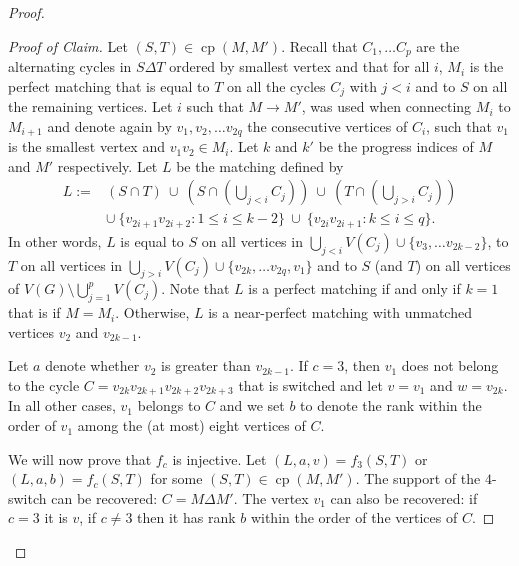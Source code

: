 \documentclass[11pt,a4paper]{article}
\theoremstyle{definition}
\newenvironment{poc}{\begin{proof}[Proof of
    Claim]\renewcommand*{\qedsymbol}{$\blacksquare$}}{\end{proof}}
\DeclareMathOperator{\cp}{cp}
\begin{document}
\begin{proof}
\begin{poc}
    Let $(S, T) \in \cp(M,M')$. Recall that $C_1, \dots C_p$ are the alternating
    cycles in $S \Delta T$ ordered by smallest vertex and that for all $i$,
    $M_i$ is the perfect matching that is equal to $T$ on all the cycles $C_j$
    with $j < i$ and to $S$ on all the remaining vertices. Let $i$ such that
    $M \rightarrow M'$, was used when connecting $M_i$ to $M_{i+1}$ and denote
    again by $v_1, v_2, \dots v_{2q}$ the consecutive vertices of $C_i$, such that
    $v_1$ is the smallest vertex and $v_1v_2 \in M_i$. Let $k$ and $k'$ be the
    progress indices of $M$ and $M'$ respectively. Let $L$ be the matching
    defined by
    \begin{align*}
      L :=& (S \cap T) \ \cup \ \left(S \cap (\bigcup_{j <i} C_j)\right) \ \cup \  \left(T \cap (\bigcup_{j >i} C_j)\right) \\
          & \cup \ \{v_{2i+1}v_{2i+2} : 1 \le  i \le k-2\}  \ \cup \ 
            \{v_{2i}v_{2i+1}: k \le i \le q\}.
    \end{align*}
    In other words, $L$ is equal to $S$ on all vertices in
    $\bigcup_{j<i} V(C_j) \cup \{v_3, \dots v_{2k-2}\}$, to $T$ on all vertices
    in $\bigcup_{j>i} V(C_j) \cup \{v_{2k}, \dots v_{2q}, v_1\}$ and to $S$ (and
    $T$) on all vertices of $V(G) \setminus \bigcup_{j=1}^p V(C_j)$. Note that
    $L$ is a perfect matching if and only if $k = 1$ that is if $M =
    M_i$. Otherwise, $L$ is a near-perfect matching with unmatched vertices
    $v_2$ and $v_{2k-1}$.

    Let $a$ denote whether $v_2$ is greater than $v_{2k-1}$. If $c=3$, then $v_1$
    does not belong to the cycle $C = v_{2k}v_{2k+1}v_{2k+2}v_{2k+3}$ that is
    switched and let $v=v_1$ and $w = v_{2k}$. In
    all other cases, $v_1$ belongs to $C$ and we set $b$ to denote the rank
    within the order of $v_1$ among the (at most) eight vertices of $C$.

    We will now prove that $f_c$ is injective. Let $(L,a,v) = f_3(S,T)$ or
    $(L,a,b) = f_c(S,T)$ for some $(S,T) \in \cp(M,M')$. The support of the
    $4$-switch can be recovered: $C = M \Delta M'$. The vertex $v_1$ can also be
    recovered: if $c =3$ it is $v$, if $c \neq 3$ then it has rank $b$ within
    the order of the vertices of $C$. 


\end{poc}
\end{proof}
\end{document}

